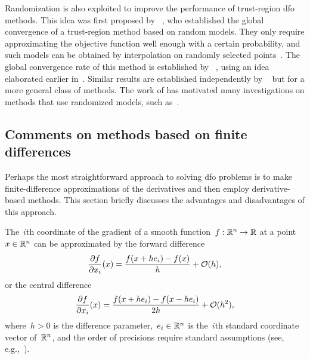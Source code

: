 Randomization is also exploited to improve the performance of trust-region \gls{dfo} methods.
This idea was first proposed by \citeauthor{Bandeira_Scheinberg_Vicente_2012}~\cite{Bandeira_Scheinberg_Vicente_2012}, who established the global convergence of a trust-region method based on random models.
They only require approximating the objective function well enough with a certain probability, and such models can be obtained by interpolation on randomly selected points~\cite{Bandeira_Scheinberg_Vicente_2014}.
The global convergence rate of this method is established by \citeauthor{Gratton_Etal_2018}~\cite{Gratton_Etal_2018}, using an idea elaborated earlier in~\cite[\S~6]{Gratton_Etal_2015}.
Similar results are established independently by \citeauthor{Cartis_Scheinberg_2018}~\cite{Cartis_Scheinberg_2018} but for a more general class of methods.
The work of \citeauthor{Bandeira_Scheinberg_Vicente_2012} has motivated many investigations on methods that use randomized models, such as~\cite{Chen_Menickelly_Scheinberg_2018}.

\subsection{Comments on methods based on finite differences}
\label{subsec:finite-difference}

Perhaps the most straightforward approach to solving \gls{dfo} problems is to make finite-difference approximations of the derivatives and then employ derivative-based methods.
This section  briefly discusses the advantages and disadvantages of this approach.

The~$i$th coordinate of the gradient of a smooth function~$f : \mathbb{R}^n \to \mathbb{R}$ at a point~$\iter \in \R^n$ can be approximated by the forward difference
\begin{equation}
    \label{eq:forward-difference}
    \frac{\partial \obj}{\partial x_i}(\iter) = \frac{\obj(\iter + h e_i) - \obj(\iter)}{h} + \bigo(h),
\end{equation}
or the central difference
\begin{equation}
    \label{eq:central-difference}
    \frac{\partial \obj}{\partial x_i}(\iter) = \frac{\obj(\iter + h e_i) - \obj(\iter - h e_i)}{2h} + \bigo(h^2),
\end{equation}
where~$h > 0$ is the difference parameter,~$e_i \in \mathbb{R}^n$ is the~$i$th standard coordinate vector of~$\mathbb{R}^n$, and the order of precisions require standard assumptions (see, e.g.,~\cite[\S~8.1]{Nocedal_Wright_2006}).

